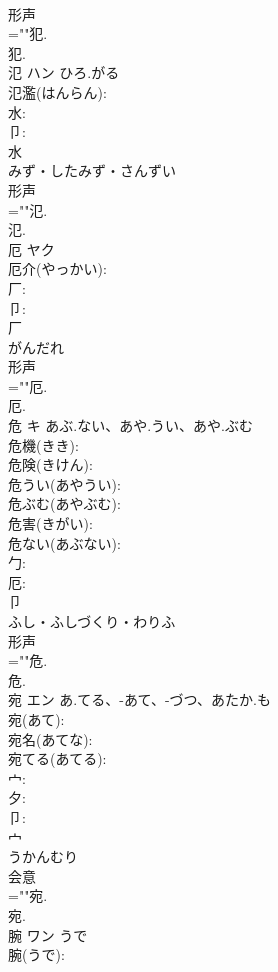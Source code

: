 \documentclass[8pt]{extreport}
\begin{document}
\begin{CJK}{UTF8}{min}
\\	形声 
\\	=""犯.
\\	犯.
\\	氾	ハン	ひろ.がる		
\\	氾濫(はんらん): 
\\	水: 
\\	卩: 
\\	水	
\\	みず・したみず・さんずい	
\\	形声 
\\	=""氾.
\\	氾.
\\	厄	ヤク			
\\	厄介(やっかい): 
\\	厂: 
\\	卩: 
\\	厂	
\\	がんだれ	
\\	形声 
\\	=""厄.
\\	厄.
\\	危	キ	あぶ.ない、あや.うい、あや.ぶむ		
\\	危機(きき): 
\\	危険(きけん): 
\\	危うい(あやうい): 
\\	危ぶむ(あやぶむ): 
\\	危害(きがい): 
\\	危ない(あぶない): 
\\	勹: 
\\	厄: 
\\	卩	
\\	ふし・ふしづくり・わりふ	
\\	形声 
\\	=""危.
\\	危.
\\	宛	エン	あ.てる、-あて、-づつ、あたか.も		
\\	宛(あて): 
\\	宛名(あてな): 
\\	宛てる(あてる): 
\\	宀: 
\\	夕: 
\\	卩: 
\\	宀	
\\	うかんむり	
\\	会意 
\\	=""宛.
\\	宛.
\\	腕	ワン	うで		
\\	腕(うで): 

\end{CJK}
\end{document}
